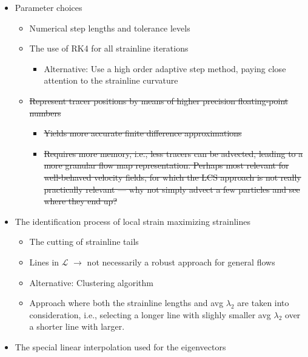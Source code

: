 \begin{framed}
\begin{itemize}
        \item Parameter choices
            \begin{itemize}
                \item Numerical step lengths and tolerance levels
                \item The use of RK4 for all strainline iterations
                    \begin{itemize}
                        \item Alternative: Use a high order adaptive step method, paying close attention to the strainline curvature
                    \end{itemize}
                \item \sout{Represent tracer positions by means of higher precision floating-point numbers}
                        \begin{itemize}
                            \item \sout{Yields more accurate finite difference approximations}
                            \item \sout{Requires more memory, i.e., less tracers can be advected, leading to
                                        a more granular flow map representation. Perhaps most relevant for
                                        well-behaved velocity fields, for which the LCS approach is not really
                                        practically relevant --- why not simply advect a few particles and see where they
                                    end up?}
                        \end{itemize}
            \end{itemize}
        \item The identification process of local strain maximizing strainlines
            \begin{itemize}
                \item The cutting of strainline tails
                \item Lines in $\mathcal{L}$ $\rightarrow$ not necessarily a robust approach for general flows
                \item Alternative: Clustering algorithm
                \item Approach where both the strainline lengths and avg $\lambda_{2}$ are taken into consideration,
                    i.e., selecting a longer line with slighly smaller avg $\lambda_{2}$ over a shorter line with larger.
            \end{itemize}
        \item The special linear interpolation used for the eigenvectors

\end{itemize}
\end{framed}

